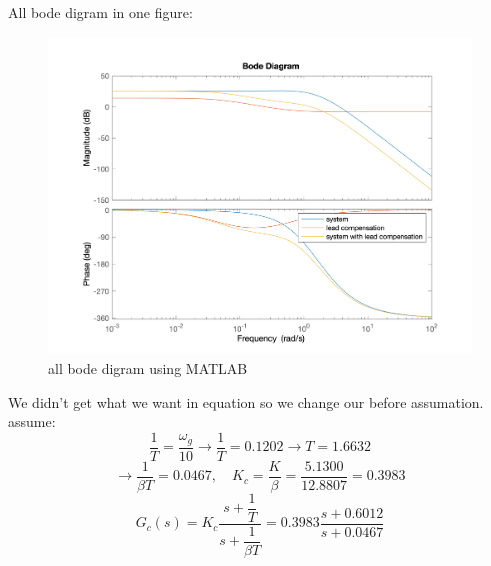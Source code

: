 All bode digram in one figure:
\begin{figure}[H]
	\caption{all bode digram using MATLAB}
	\centering
	\includegraphics[width=12cm]{../Figure/Q1/b/all_in_one.png}
\end{figure}
We didn't get what we want in equation so we change our before assumation.
assume:
$$
\dfrac{1}{T} = \dfrac{\omega_g}{10} 
\to \dfrac{1}{T}  = 0.1202 \to T = 1.6632
$$
$$
\to \dfrac{1}{\beta T} = 0.0467, \quad K_c = \dfrac{K}{\beta} = \dfrac{5.1300}{12.8807} = 0.3983
$$
$$
G_c(s) = K_c \dfrac{s + \dfrac{1}{T}}{s + \dfrac{1}{\beta T}}
= 0.3983 \dfrac{s + 0.6012}{s + 0.0467}
$$